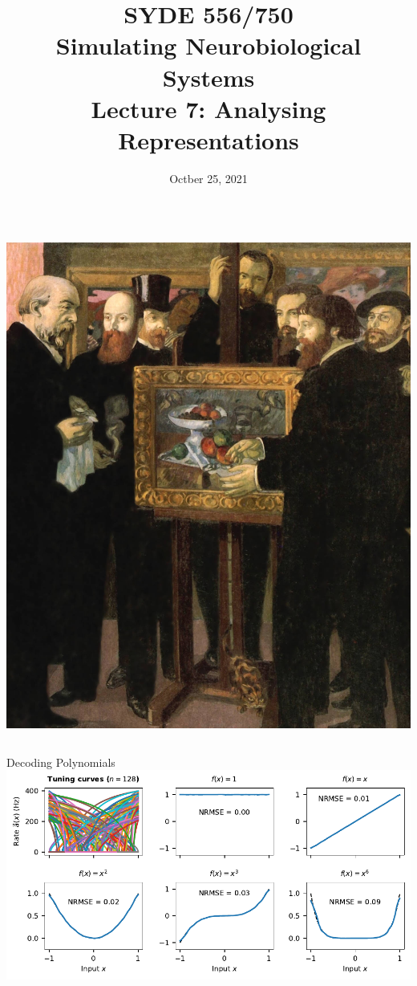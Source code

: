 \documentclass[handout,aspectratio=169]{beamer}
\date{Octber 25, 2021}
\title{SYDE 556/750 \\ Simulating Neurobiological Systems \\ Lecture 7: Analysing Representations}
\begin{document}
	
	\begin{frame}{}
		\vspace{0.5cm}
		\begin{columns}[c]
			\MakeTitle
			\includegraphics[width=\textwidth]{media/maurice_denis_homage_to_cezanne_1900_small.jpg}
		\end{columns}
	\end{frame}

	\begin{frame}{Decoding Polynomials}
		\centering
		\includegraphics[width=\textwidth]{media/poly_decodings.pdf} 
	\end{frame}
\end{document}
